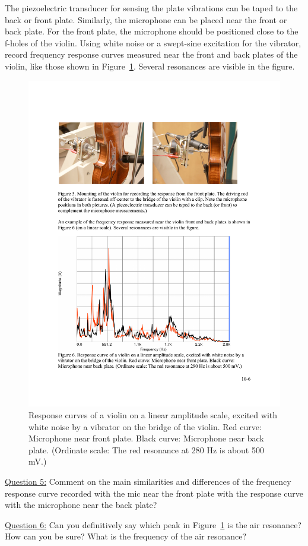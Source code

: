 \documentclass[11pt]{NSF}
\begin{document}
The piezoelectric transducer for sensing the plate vibrations can be
taped to the back or front plate.
Similarly, the microphone can be placed near the front or
back plate. 
For the front plate, the microphone should be positioned close to 
the f-holes of the violin. 
Using white noise or a swept-sine excitation for the vibrator, 
record frequency response curves measured 
near the front and back plates of the violin, like those 
shown in Figure~\ref{f:6}.
Several resonances are visible in the figure.
%
\begin{figure}[hbtp]
\begin{center}
\includegraphics[width=.7\textwidth]{fig10_6}
\caption{Response curves of a violin on a linear amplitude scale,
excited with white noise by a vibrator on the bridge of the violin.
Red curve: Microphone near front plate. Black curve: Microphone near
back plate. (Ordinate scale: The red resonance at 280 Hz is about 500
mV.)}
\label{f:6}
\end{center}
\end{figure}
%

\underline{Question 5:}
Comment on the main similarities and differences of the frequency
response curve recorded with the mic near the front plate with the response curve with the microphone near the back plate?

\underline{Question 6:}
Can you definitively say which peak in Figure~\ref{f:6} is the air
resonance? How can you be sure? What is the frequency of the air
resonance?
\end{document}
